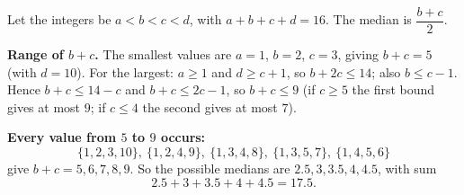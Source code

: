 Let the integers be $a<b<c<d$, with $a+b+c+d=16$. The median is $\dfrac{b+c}{2}$.

\textbf{Range of $b+c$.} The smallest values are $a=1$, $b=2$, $c=3$, giving $b+c=5$ (with $d=10$). For the largest: $a\ge1$ and $d\ge c+1$, so $b+2c\le14$; also $b\le c-1$. Hence $b+c\le14-c$ and $b+c\le2c-1$, so $b+c\le9$ (if $c\ge5$ the first bound gives at most $9$; if $c\le4$ the second gives at most $7$).

\textbf{Every value from $5$ to $9$ occurs:}
\[
\{1,2,3,10\},\ \{1,2,4,9\},\ \{1,3,4,8\},\ \{1,3,5,7\},\ \{1,4,5,6\}
\]
give $b+c=5,6,7,8,9$. So the possible medians are $2.5,3,3.5,4,4.5$, with sum
\[
2.5+3+3.5+4+4.5=\boxed{17.5}.
\]
